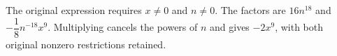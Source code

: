 The original expression requires $x\ne0$ and $n\ne0$. The factors are $16n^{18}$ and $-\dfrac{1}{8}n^{-18}x^9$. Multiplying cancels the powers of $n$ and gives $\boxed{-2x^9}$, with both original nonzero restrictions retained.
